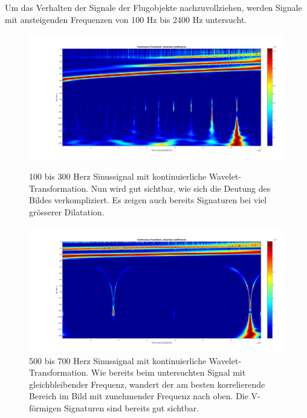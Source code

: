 \begin{refsection}
Um das Verhalten der Signale der Flugobjekte nachzuvollziehen, werden Signale mit ansteigenden Frequenzen von 100 Hz bis 2400 Hz untersucht.
\begin{figure}[h]
	\centering
	\includegraphics[width=0.9\linewidth]{papers/meteor/images/anomalie/sweep/cwt_0100to0300hz.png}
	\caption{100 bis 300 Herz Sinussignal mit kontinuierliche Wavelet-Transformation.
	Nun wird gut sichtbar, wie sich die Deutung des Bildes verkompliziert. 
	Es zeigen auch bereits Signaturen bei viel grösserer Dilatation.}
	\includegraphics[width=0.9\linewidth]{papers/meteor/images/anomalie/sweep/cwt_0500to0700hz.png}
	\caption{500 bis 700 Herz Sinussignal mit kontinuierliche Wavelet-Transformation.
	Wie bereits beim untersuchten Signal mit gleichbleibender Frequenz, wandert der am besten korrelierende Bereich im Bild mit zunehmender Frequenz nach oben.
	Die V-förmigen Signaturen sind bereits gut sichtbar.}
	\label{fig:cwt_anomalie_beam_1}
\end{figure}


\end{refsection}
